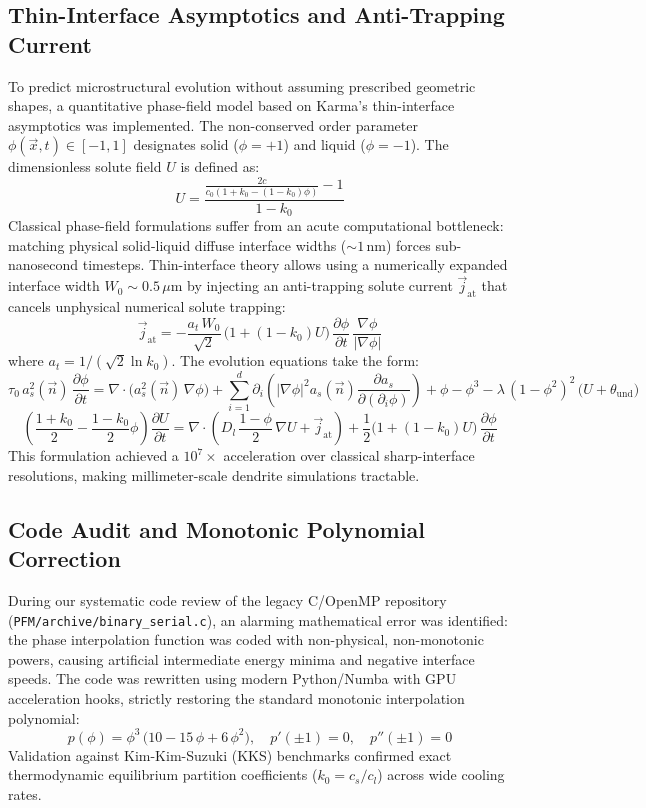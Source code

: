\documentclass[10pt,a4paper]{article}
\begin{document}
\subsection{Thin-Interface Asymptotics and Anti-Trapping Current}
To predict microstructural evolution without assuming prescribed geometric shapes, a quantitative phase-field model based on Karma's thin-interface asymptotics was implemented. The non-conserved order parameter \(\phi(\vec{x},t) \in [-1, 1]\) designates solid (\(\phi = +1\)) and liquid (\(\phi = -1\)). The dimensionless solute field \(U\) is defined as:
\[
U = \frac{\frac{2 c}{c_0 (1+k_0 - (1-k_0)\phi)} - 1}{1 - k_0}
\]
Classical phase-field formulations suffer from an acute computational bottleneck: matching physical solid-liquid diffuse interface widths (\(\sim 1\,\mathrm{nm}\)) forces sub-nanosecond timesteps. Thin-interface theory allows using a numerically expanded interface width \(W_0 \sim 0.5\,\mu\mathrm{m}\) by injecting an anti-trapping solute current \(\vec{j}_{\mathrm{at}}\) that cancels unphysical numerical solute trapping:
\[
\vec{j}_{\mathrm{at}} = -\frac{a_t\,W_0}{\sqrt{2}}\,\bigl(1 + (1-k_0)U\bigr)\,\frac{\partial \phi}{\partial t}\,\frac{\nabla \phi}{|\nabla \phi|}
\]
where \(a_t = 1/(\sqrt{2} \ln k_0)\). The evolution equations take the form:
\[
\tau_0\,a_s^2(\vec{n})\,\frac{\partial \phi}{\partial t} = \nabla \cdot \bigl(a_s^2(\vec{n})\,\nabla \phi\bigr) + \sum_{i=1}^d \partial_i \left(|\nabla \phi|^2 a_s(\vec{n}) \frac{\partial a_s}{\partial (\partial_i \phi)}\right) + \phi - \phi^3 - \lambda\,(1-\phi^2)^2\,\bigl(U + \theta_{\mathrm{und}}\bigr)
\]
\[
\left(\frac{1+k_0}{2} - \frac{1-k_0}{2}\phi\right)\frac{\partial U}{\partial t} = \nabla \cdot \left(D_l\,\frac{1-\phi}{2}\,\nabla U + \vec{j}_{\mathrm{at}}\right) + \frac{1}{2}\bigl(1 + (1-k_0)U\bigr)\,\frac{\partial \phi}{\partial t}
\]
This formulation achieved a \(10^7\times\) acceleration over classical sharp-interface resolutions, making millimeter-scale dendrite simulations tractable.

\subsection{Code Audit and Monotonic Polynomial Correction}
During our systematic code review of the legacy C/OpenMP repository (\texttt{PFM/archive/binary\_serial.c}), an alarming mathematical error was identified: the phase interpolation function was coded with non-physical, non-monotonic powers, causing artificial intermediate energy minima and negative interface speeds. The code was rewritten using modern Python/Numba with GPU acceleration hooks, strictly restoring the standard monotonic interpolation polynomial:
\[
p(\phi) = \phi^3\,\bigl(10 - 15\,\phi + 6\,\phi^2\bigr), \quad p'(\pm 1) = 0, \quad p''( \pm 1) = 0
\]
Validation against Kim-Kim-Suzuki (KKS) benchmarks confirmed exact thermodynamic equilibrium partition coefficients (\(k_0 = c_s/c_l\)) across wide cooling rates.
\end{document}
